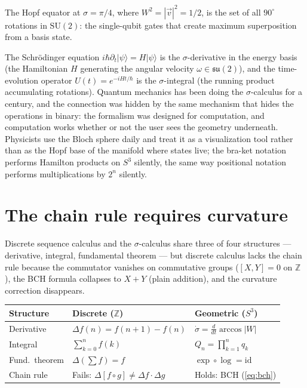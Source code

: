 \documentclass[12pt]{article}
\begin{document}
The Hopf equator at $\sigma = \pi/4$, where $W^2 = |\vec{v}|^2 = 1/2$, is the set of all $90^\circ$ rotations in $\mathrm{SU}(2)$: the single-qubit gates that create maximum superposition from a basis state.

The Schr\"odinger equation $i\hbar\partial_t|\psi\rangle = H|\psi\rangle$ is the $\sigma$-derivative in the energy basis (the Hamiltonian $H$ generating the angular velocity $\omega \in \mathfrak{su}(2)$), and the time-evolution operator $U(t) = e^{-iHt/\hbar}$ is the $\sigma$-integral (the running product accumulating rotations). Quantum mechanics has been doing the $\sigma$-calculus for a century, and the connection was hidden by the same mechanism that hides the operations in binary: the formalism was designed for computation, and computation works whether or not the user sees the geometry underneath. Physicists use the Bloch sphere daily and treat it as a visualization tool rather than as the Hopf base of the manifold where states live; the bra-ket notation performs Hamilton products on $S^3$ silently, the same way positional notation performs multiplications by $2^n$ silently.


\section{The chain rule requires curvature}

Discrete sequence calculus and the $\sigma$-calculus share three of four structures --- derivative, integral, fundamental theorem --- but discrete calculus lacks the chain rule because the commutator vanishes on commutative groups ($[X,Y] = 0$ on $\mathbb{Z}$), the BCH formula collapses to $X + Y$ (plain addition), and the curvature correction disappears.

\begin{center}
\begin{tabular}{l l l}
    \toprule
    Structure & Discrete ($\mathbb{Z}$) & Geometric ($S^3$) \\
    \midrule
    Derivative & $\Delta f(n) = f(n{+}1) - f(n)$ & $\dot{\sigma} = \frac{d}{dt}\arccos|W|$ \\[4pt]
    Integral & $\sum_{k=0}^n f(k)$ & $Q_n = \prod_{k=1}^n q_k$ \\[4pt]
    Fund.\ theorem & $\Delta(\sum f) = f$ & $\exp \circ \log = \mathrm{id}$ \\[4pt]
    Chain rule & Fails: $\Delta[f \circ g] \neq \Delta f \cdot \Delta g$ & Holds: BCH (\ref{eq:bch}) \\
    \bottomrule
\end{tabular}
\end{center}
\end{document}

